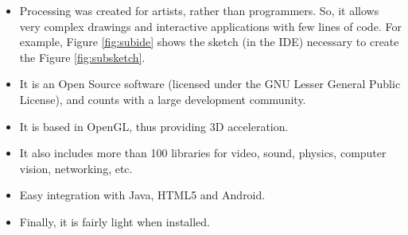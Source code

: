 \documentclass[conference]{IEEEtran}
\begin{document}
\begin{itemize}
\item Processing was created for artists, rather than programmers. So, it allows very complex drawings and interactive applications with few lines of code. For example, Figure \ref{fig:subide} shows the sketch (in the IDE) necessary to create the Figure \ref{fig:subsketch}.
\item It is an Open Source software (licensed under the GNU Lesser General Public License), and counts with a large development community.
\item It is based in OpenGL, thus providing 3D acceleration.
\item It also includes more than 100 libraries for video, sound, physics, computer vision, networking, etc.
\item Easy integration with Java, HTML5 and Android.
\item Finally, it is fairly light when installed.
\end{itemize}
\end{document}

